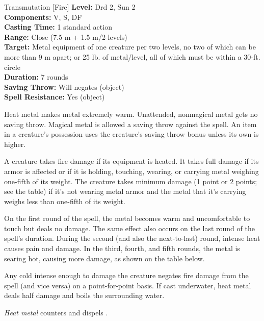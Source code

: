 {Transmutation [Fire]}
{
	\textbf{Level:}
	Drd 2, Sun 2\\
	\textbf{Components:}
	V, S, DF\\
	\textbf{Casting Time:}
	1 standard action\\
	\textbf{Range:}
	Close (7.5 m + 1.5 m/2 levels)\\
	\textbf{Target:}
	Metal equipment of one creature per two levels, no two of which can be more than 9 m apart; or 25 lb. of metal/level, all of which must be within a 30-ft. circle\\
	\textbf{Duration:}
	7 rounds\\
	\textbf{Saving Throw:}
	Will negates (object)\\
	\textbf{Spell Resistance:}
	Yes (object)\\
}
{
	Heat metal makes metal extremely warm. Unattended, nonmagical metal gets no saving throw. Magical metal is allowed a saving throw against the spell. An item in a creature's possession uses the creature's saving throw bonus unless its own is higher.

	A creature takes fire damage if its equipment is heated. It takes full damage if its armor is affected or if it is holding, touching, wearing, or carrying metal weighing one-fifth of its weight. The creature takes minimum damage (1 point or 2 points; see the table) if it's not wearing metal armor and the metal that it's carrying weighs less than one-fifth of its weight.


	On the first round of the spell, the metal becomes warm and uncomfortable to touch but deals no damage. The same effect also occurs on the last round of the spell's duration. During the second (and also the next-to-last) round, intense heat causes pain and damage. In the third, fourth, and fifth rounds, the metal is searing hot, causing more damage, as shown on the table below.

	Any cold intense enough to damage the creature negates fire damage from the spell (and vice versa) on a point-for-point basis. If cast underwater, heat metal deals half damage and boils the surrounding water.

	\emph{Heat metal} counters and dispels .

}
